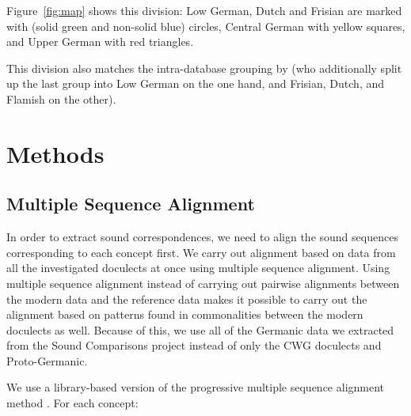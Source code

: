 \documentclass[a4paper]{article}
\begin{document}
Figure~\ref{fig:map} shows this division:
Low German, Dutch and Frisian are marked with (solid green and non-solid blue) circles,
Central German with yellow squares, and Upper German with red triangles.

This division also matches the intra-database grouping by \citet{heggarty2018sound}
(who additionally split up the last group into
Low German on the one hand,
and Frisian, Dutch, and Flamish on the other).

\section{Methods}
\label{sec:methods}

\subsection{Multiple Sequence Alignment}
\label{subsec:msa}

In order to extract sound correspondences,
we need to align the sound sequences corresponding to each concept first.
We carry out alignment based on data from
all the investigated doculects at once using multiple sequence alignment.
Using multiple sequence alignment instead of carrying out
pairwise alignments between the modern data and the reference data
makes it possible to carry out the alignment
based on patterns found in commonalities between the modern doculects as well.
Because of this, we use all of the Germanic data
we extracted from the Sound Comparisons project
instead of only the CWG doculects and Proto-Germanic.

We use a library-based version \citep{notredame2000t-coffee:} of the progressive multiple sequence alignment method \citep{thompson1994clustal}.
For each concept:
\end{document}
